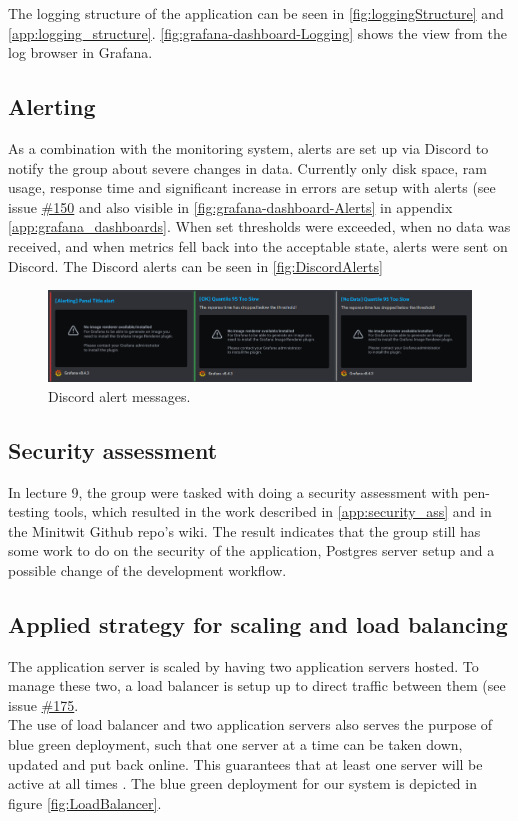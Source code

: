 The logging structure of the application can be seen in \autoref{fig:loggingStructure} and \autoref{app:logging_structure}.  \autoref{fig:grafana-dashboard-Logging} shows the view from the log browser in Grafana.

\subsection{Alerting}
As a combination with the monitoring system, alerts are set up via Discord to notify the group about severe changes in data. Currently only disk space, ram usage, response time and significant increase in errors are setup with alerts (see issue \href{https://github.com/DevelOpsITU/MiniTwit/issues/150}{\#150} and also visible in \autoref{fig:grafana-dashboard-Alerts} in appendix \ref{app:grafana_dashboards}.
When set thresholds were exceeded, when no data was received, and when metrics fell back into the acceptable state, alerts were sent on Discord. The Discord alerts can be seen in \autoref{fig:DiscordAlerts}
\begin{figure}[H]
    \centering
    \includegraphics[width=\linewidth]{images/monitoring/alert_messages.png}
    \caption{Discord alert messages.}
    \label{fig:DiscordAlerts}
\end{figure}

\subsection{Security assessment}
In lecture 9, the group were tasked with doing a security assessment with pen-testing tools, which resulted in the work described in \autoref{app:security_ass} and in the Minitwit Github repo's wiki.\cite{github_wiki_security} The result indicates that the group still has some work to do on the security of the application, Postgres server setup and a possible change of the development workflow. 


\subsection{Applied strategy for scaling and load balancing}
The application server is scaled by having two application servers hosted. To manage these two, a load balancer is setup up to direct traffic between them (see issue \href{https://github.com/DevelOpsITU/MiniTwit/issues/175}{\#175}. \\
The use of load balancer and two application servers also serves the purpose of blue green deployment, such that one server at a time can be taken down, updated and put back online. This guarantees that at least one server will be active at all times \cite{blue_green_deployment}. The blue green deployment for our system is depicted in figure \ref{fig:LoadBalancer}.

